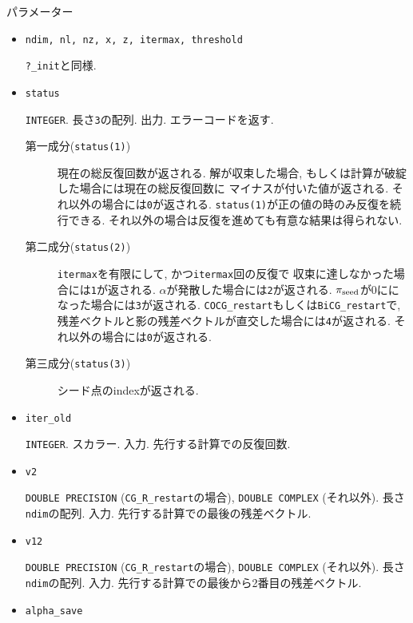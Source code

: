 \documentclass[12pt,titlepage]{jarticle}
\begin{document}
\noindent パラメーター

\begin{itemize}

\item \verb|ndim, nl, nz, x, z, itermax, threshold|

  \verb|?_init|と同様.

\item \verb|status|

  \verb|INTEGER|. 長さ\verb|3|の配列. 出力. エラーコードを返す.
  \begin{description}
  \item [第一成分(\texttt{status(1)})]
    現在の総反復回数が返される.
    解が収束した場合, もしくは計算が破綻した場合には現在の総反復回数に
    マイナスが付いた値が返される.
    それ以外の場合には\verb|0|が返される.
    \verb|status(1)|が正の値の時のみ反復を続行できる.
    それ以外の場合は反復を進めても有意な結果は得られない.
    
  \item [第二成分(\texttt{status(2)})]
    \verb|itermax|を有限にして, かつ\verb|itermax|回の反復で
    収束に達しなかった場合には\verb|1|が返される.
    $\alpha$が発散した場合には\verb|2|が返される.
    $\pi_{\rm seed}$が0にになった場合には\verb|3|が返される.
    \verb|COCG_restart|もしくは\verb|BiCG_restart|で,
    残差ベクトルと影の残差ベクトルが直交した場合には\verb|4|が返される.
    それ以外の場合には\verb|0|が返される.

  \item [第三成分(\texttt{status(3)})]
    シード点のindexが返される.
  \end{description}

\item \verb|iter_old|

  \verb|INTEGER|. スカラー. 入力. 先行する計算での反復回数.

\item \verb|v2|

  \verb|DOUBLE PRECISION| (\verb|CG_R_restart|の場合),
  \verb|DOUBLE COMPLEX| (それ以外).
  長さ\verb|ndim|の配列. 入力.
  先行する計算での最後の残差ベクトル.

\item \verb|v12|

  \verb|DOUBLE PRECISION| (\verb|CG_R_restart|の場合),
  \verb|DOUBLE COMPLEX| (それ以外).
  長さ\verb|ndim|の配列. 入力.
  先行する計算での最後から2番目の残差ベクトル.

\item \verb|alpha_save|


\end{itemize}
\end{document}
